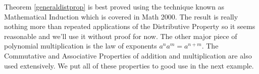 
\medskip

Theorem \ref{generaldistprop} is best proved using the technique known as Mathematical Induction which is covered in Math 2000.  The result is really nothing more than repeated applications of the Distributive Property so it seems reasonable and we'll use it without proof for now.  The other major piece of polynomial multiplication is the law of exponents  $a^n a^m = a^{n+m}$.  The Commutative and Associative Properties of addition and multiplication are also used extensively.  We put all of these properties to good use in the next example.

\enlargethispage{1.5\baselineskip}

\medskip

